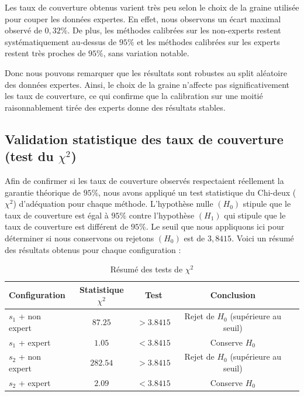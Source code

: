 \documentclass[a4paper,12pt]{article}
\begin{document}
Les taux de couverture obtenus varient très peu selon le choix de la graine utilisée pour couper les données expertes. En effet, nous observons un écart maximal observé de $0,32\%$. De plus, les méthodes calibrées sur les non-experts restent systématiquement au-dessus de $95\%$ et les méthodes calibrées sur les experts restent très proches de $95\%$, sans variation notable.

\vspace{0.2cm}

Donc nous pouvons remarquer que les résultats sont robustes au split aléatoire des données expertes. Ainsi, le choix de la graine n’affecte pas significativement les taux de couverture, ce qui confirme que la calibration sur une moitié raisonnablement tirée des experts donne des résultats stables.

\subsection{Validation statistique des taux de couverture (test du $\chi^2$)}

Afin de confirmer si les taux de couverture observés respectaient réellement la garantie théorique de $95\%$, nous avons appliqué un test statistique du Chi-deux ($\chi^2$) d’adéquation pour chaque méthode. L’hypothèse nulle $(H_0)$ stipule que le taux de couverture est égal à $95\%$ contre l'hypothèse $(H_1)$ qui stipule que le taux de couverture est différent de $95\%$. Le seuil que nous appliquons ici pour déterminer si nous conservons ou rejetons $(H_0)$ est de $3,8415$. Voici un résumé des résultats obtenus pour chaque configuration :

\begin{table}[H]
    \centering
    \begin{tabular}{|l|c|c|c|c|}
        \hline
        \textbf{Configuration} & \textbf{Statistique $\chi^2$} & \textbf{Test} & \textbf{Conclusion} \\
        \hline
        $s_1$ + non expert & $87.25$ & $> 3.8415$ & Rejet de $H_0$ (supérieure au seuil) \\
        $s_1$ + expert & $1.05$ & $< 3.8415$  & Conserve $H_0$ \\
        $s_2$ + non expert & $282.54$ & $> 3.8415$ & Rejet de $H_0$ (supérieure au seuil) \\
        $s_2$ + expert & $2.09$ & $< 3.8415$ & Conserve $H_0$ \\
        \hline
    \end{tabular}
    \caption{Résumé des tests de $\chi^2$}
    \label{tab:Tests du Chi-2}
\end{table}
\end{document}

